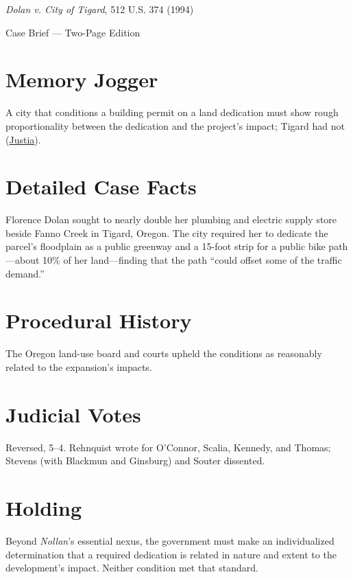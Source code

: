 \documentclass[12pt]{article}
\begin{document}
\begin{center}
{\LARGE \textit{Dolan v. City of Tigard}, 512 U.S. 374 (1994)\par}
\vspace{0.5em}
{\large Case Brief --- Two-Page Edition\par}
\end{center}

\section{Memory Jogger}
A city that conditions a building permit on a land dedication must show rough proportionality between the dedication and the project's impact; Tigard had not (\href{https://supreme.justia.com/cases/federal/us/512/374/}{Justia}).

\section{Detailed Case Facts}
Florence Dolan sought to nearly double her plumbing and electric supply store beside Fanno Creek in Tigard, Oregon. The city required her to dedicate the parcel's floodplain as a public greenway and a 15-foot strip for a public bike path---about 10\% of her land---finding that the path ``could offset some of the traffic demand.''

\section{Procedural History}
The Oregon land-use board and courts upheld the conditions as reasonably related to the expansion's impacts.

\section{Judicial Votes}
Reversed, 5--4. Rehnquist wrote for O'Connor, Scalia, Kennedy, and Thomas; Stevens (with Blackmun and Ginsburg) and Souter dissented.

\section{Holding}
Beyond \textit{Nollan}'s essential nexus, the government must make an individualized determination that a required dedication is related in nature and extent to the development's impact. Neither condition met that standard.
\end{document}

